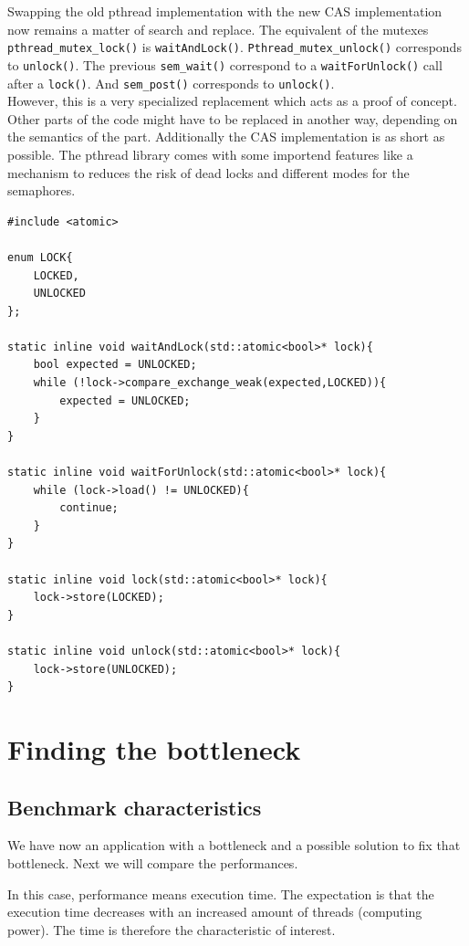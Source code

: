 Swapping the old pthread implementation with the new CAS implementation now remains a matter of search and replace. The equivalent of the mutexes \texttt{pthread\_mutex\_lock()} is \texttt{waitAndLock()}. \texttt{Pthread\_mutex\_unlock()} corresponds to \texttt{unlock()}. The previous \texttt{sem\_wait()} correspond to a \texttt{waitForUnlock()} call after a \texttt{lock()}. And \texttt{sem\_post()} corresponds to \texttt{unlock()}.\\
However, this is a very specialized replacement which acts as a proof of concept. Other parts of the code might have to be replaced in another way, depending on the semantics of the part. Additionally the CAS implementation is as short as possible. The pthread library comes with some importend features like a mechanism to reduces the risk of dead locks and different modes for the semaphores.

\begin{lstlisting}
#include <atomic>

enum LOCK{
    LOCKED,
    UNLOCKED
};

static inline void waitAndLock(std::atomic<bool>* lock){
    bool expected = UNLOCKED;
    while (!lock->compare_exchange_weak(expected,LOCKED)){
        expected = UNLOCKED;
    }
}

static inline void waitForUnlock(std::atomic<bool>* lock){
    while (lock->load() != UNLOCKED){
        continue;
    }
}

static inline void lock(std::atomic<bool>* lock){
    lock->store(LOCKED);
}

static inline void unlock(std::atomic<bool>* lock){
    lock->store(UNLOCKED);
}
\end{lstlisting}

\section{Finding the bottleneck}
\subsection{Benchmark characteristics}
We have now an application with a bottleneck and a possible solution to fix that bottleneck. Next we will compare the performances.

In this case, performance means execution time. The expectation is that the execution time decreases with an increased amount of threads (computing power). The time is therefore the characteristic of interest.

